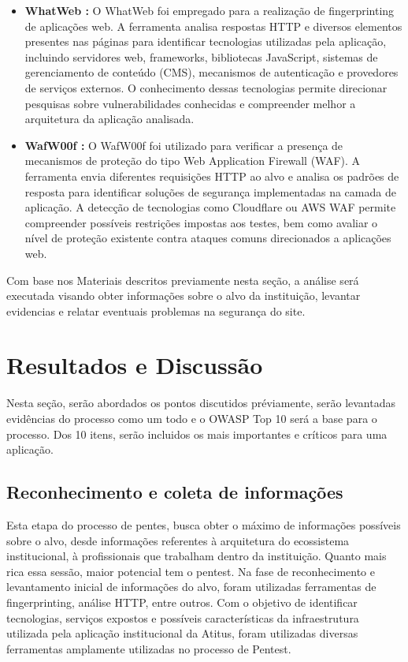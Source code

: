 \documentclass[12pt]{article}
\begin{document}
\begin{itemize}
\item \textbf{WhatWeb \cite{whatweb}:} O WhatWeb foi empregado para a realização de fingerprinting de aplicações web. A ferramenta analisa respostas HTTP e diversos elementos presentes 
nas páginas para identificar tecnologias utilizadas pela aplicação, incluindo servidores web, frameworks, bibliotecas JavaScript, sistemas de gerenciamento de conteúdo (CMS), mecanismos 
de autenticação e provedores de serviços externos. O conhecimento dessas tecnologias permite direcionar pesquisas sobre vulnerabilidades conhecidas e compreender melhor a arquitetura da 
aplicação analisada.

\item \textbf{WafW00f \cite{wafw00f}:} O WafW00f foi utilizado para verificar a presença de mecanismos de proteção do tipo Web Application Firewall (WAF). A ferramenta envia diferentes 
requisições HTTP ao alvo e analisa os padrões de resposta para identificar soluções de segurança implementadas na camada de aplicação. A detecção de tecnologias como Cloudflare ou AWS WAF 
permite compreender possíveis restrições impostas aos testes, bem como avaliar o nível de proteção existente contra ataques comuns direcionados a aplicações web.


\end{itemize}


Com base nos Materiais descritos previamente nesta seção, a análise será executada visando obter informações sobre o alvo da instituição, levantar evidencias e relatar eventuais 
problemas na segurança do site.

\section{Resultados e Discussão}

Nesta seção, serão abordados os pontos discutidos préviamente, serão levantadas evidências do processo como um todo e o OWASP Top 10 será a base para o processo. 
Dos 10 itens, serão incluidos os mais importantes e críticos para uma aplicação. 

\subsection{Reconhecimento e coleta de informações}
Esta etapa do processo de pentes, busca obter o máximo de informações possíveis sobre o alvo, desde informações referentes à arquitetura do ecossistema institucional, 
à profissionais que trabalham dentro da instituição. 
Quanto mais rica essa sessão, maior potencial tem o pentest. 
Na fase de reconhecimento e levantamento inicial de informações do alvo, foram utilizadas ferramentas de fingerprinting, análise HTTP, entre outros. 
Com o objetivo de identificar tecnologias, serviços expostos e possíveis características da infraestrutura utilizada pela aplicação institucional da Atitus, 
foram utilizadas diversas ferramentas amplamente utilizadas no processo de Pentest.
\end{document}
